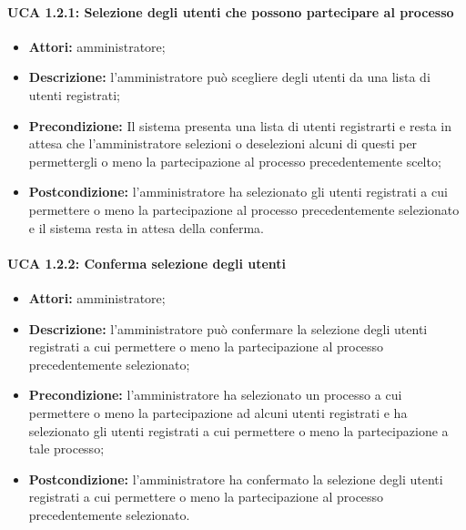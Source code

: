 \paragraph{UCA 1.2.1: Selezione degli utenti che possono partecipare al processo}
\begin{itemize}
\item \textbf{Attori:} 
amministratore;
\item \textbf{Descrizione:} 
l'amministratore può scegliere degli utenti da una lista di utenti registrati; 
\item \textbf{Precondizione:} 
Il sistema presenta una lista di utenti registrarti e resta in attesa che l'amministratore selezioni o deselezioni alcuni di questi per permettergli o meno la partecipazione al processo precedentemente scelto;
\item \textbf{Postcondizione:} 
l'amministratore ha selezionato gli utenti registrati a cui permettere o meno la partecipazione al processo precedentemente selezionato e il sistema resta in attesa della conferma.
\end{itemize}

\paragraph{UCA 1.2.2: Conferma selezione degli utenti}
\begin{itemize}
\item \textbf{Attori:} 
amministratore;
\item \textbf{Descrizione:} 
l'amministratore può confermare la selezione degli utenti registrati a cui permettere o meno la partecipazione al processo precedentemente selezionato; 
\item \textbf{Precondizione:} 
l'amministratore ha selezionato un processo a cui permettere o meno la partecipazione ad alcuni utenti registrati e ha selezionato gli utenti registrati a cui permettere o meno la partecipazione a tale processo;
\item \textbf{Postcondizione:} 
l'amministratore ha confermato la selezione degli utenti registrati a cui permettere o meno la partecipazione al processo precedentemente selezionato.
\end{itemize}


